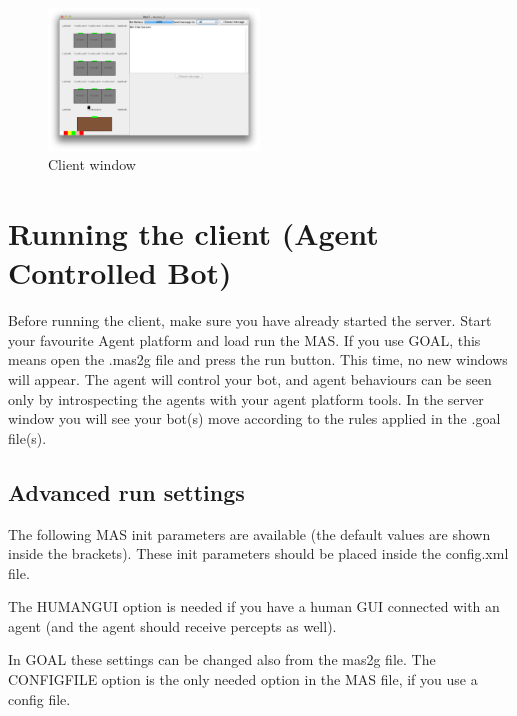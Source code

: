 \documentclass[11pt,a4paper]{article}
\begin{document}
\begin{figure}[!h]
\begin{center}
  \includegraphics[width=0.5\textwidth]{HumanPlayerGUI/hpg.png}
  \caption{Client window}\label{fig:Client}
\end{center}
\end{figure}


\section{Running the client (Agent Controlled Bot)}
Before running the client, make sure you have already started the server. Start your favourite Agent platform and load run the MAS. If you use GOAL, this means open the .mas2g file and press the run button. This time, no new windows will appear. The agent will control your bot,  and agent behaviours can be seen only by introspecting the agents with your agent platform tools. In the server window you will see your bot(s) move according to the rules applied in the .goal file(s).

\subsection{Advanced run settings}
\label{sec:clientadvancedrunsettings}
The following MAS init parameters are available (the default values are shown inside the brackets). These init parameters should be placed inside the config.xml file. 

The HUMANGUI option is needed if you have a human GUI connected with an agent (and the agent should receive percepts as well).

In GOAL these settings can be changed also from the mas2g file. The CONFIGFILE option is the only needed option in the MAS file, if you use a config file.  
\end{document}
